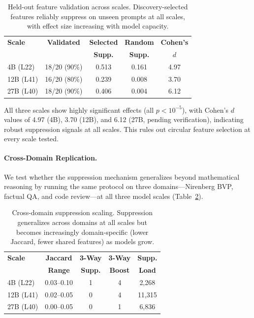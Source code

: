 \documentclass[10pt,twocolumn]{article}
\begin{document}
\begin{table}[t]
\centering
\caption{Held-out feature validation across scales. Discovery-selected features reliably suppress on unseen prompts at all scales, with effect size increasing with model capacity.}
\label{tab:heldout}
\small
\begin{tabular}{@{}lcccc@{}}
\toprule
\textbf{Scale} & \textbf{Validated} & \textbf{Selected} & \textbf{Random} & \textbf{Cohen's} \\
 & & \textbf{Supp.} & \textbf{Supp.} & $d$ \\
\midrule
4B (L22)  & 18/20 (90\%) & 0.513 & 0.161 & 4.97 \\
12B (L41) & 16/20 (80\%) & 0.239 & 0.008 & 3.70 \\
27B (L40) & 18/20 (90\%) & 0.406 & 0.004 & 6.12 \\
\bottomrule
\end{tabular}
\end{table}

All three scales show highly significant effects (all $p < 10^{-5}$), with Cohen's $d$ values of 4.97 (4B), 3.70 (12B), and 6.12 (27B, pending verification), indicating robust suppression signals at all scales.
This rules out circular feature selection at every scale tested.

\paragraph{Cross-Domain Replication.}
We test whether the suppression mechanism generalizes beyond mathematical reasoning by running the same protocol on three domains---Nirenberg BVP, factual QA, and code review---at all three model scales (Table~\ref{tab:crossdomain}).

\begin{table}[t]
\centering
\caption{Cross-domain suppression scaling. Suppression generalizes across domains at all scales but becomes increasingly domain-specific (lower Jaccard, fewer shared features) as models grow.}
\label{tab:crossdomain}
\small
\begin{tabular}{@{}lcccc@{}}
\toprule
\textbf{Scale} & \textbf{Jaccard} & \textbf{3-Way} & \textbf{3-Way} & \textbf{Supp.} \\
 & \textbf{Range} & \textbf{Supp.} & \textbf{Boost} & \textbf{Load} \\
\midrule
4B (L22)  & 0.03--0.10 & 1 & 4 & 2,268 \\
12B (L41) & 0.02--0.05 & 0 & 4 & 11,315 \\
27B (L40) & 0.00--0.05 & 0 & 1 & 6,836 \\
\bottomrule
\end{tabular}
\end{table}
\end{document}

